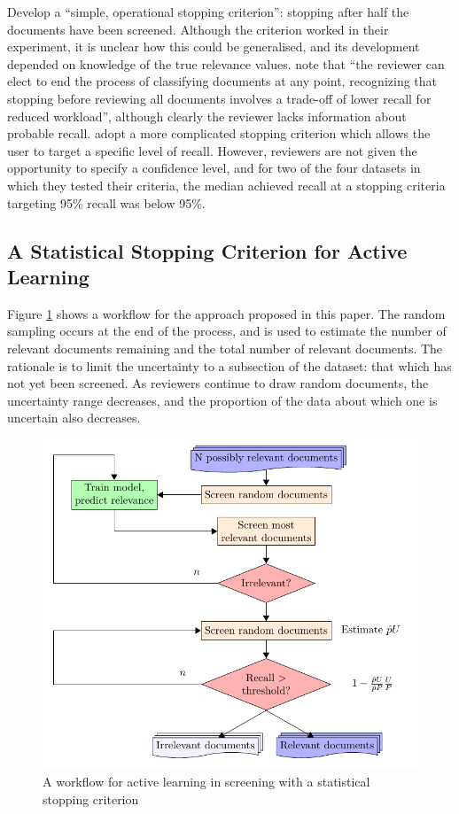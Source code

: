 \documentclass{bmcart}
\begin{document}
\cite{Wallace2010a} Develop a ``simple, operational stopping criterion'': stopping after half the documents have been screened. Although the criterion worked in their experiment, it is unclear how this could be generalised, and its development depended on knowledge of the true relevance values. 
\cite{Jonnalagadda2013} note that ``the reviewer can elect to end the process of classifying documents at any point, recognizing that stopping before reviewing all documents involves a trade-off of lower recall for reduced workload'', although clearly the reviewer lacks information about probable recall.
\cite{Yu2019} adopt a more complicated stopping criterion  which allows the user to target a specific level of recall. However, reviewers are not given the opportunity to specify a confidence level, and for two of the four datasets in which they tested their criteria, the median achieved recall at a stopping criteria targeting 95\% recall was below 95\%.



\subsection*{A Statistical Stopping Criterion for Active Learning}
	Figure \ref{flow} shows a workflow for the approach proposed in this paper. 
	The random sampling occurs at the end of the process, and is used to estimate the number of relevant documents remaining and the total number of relevant documents. 
	The rationale is to limit the uncertainty to a subsection of the dataset: that which has not yet been screened. 
	As reviewers continue to draw random documents, the uncertainty range decreases, and the proportion of the data about which one is uncertain also decreases.
	
	\begin{figure}
		\includegraphics[width=0.5\linewidth]{../images/flow}
		\caption{A workflow for active learning in screening with a statistical stopping criterion}
		\label{flow}
	\end{figure}
	
\end{document}
